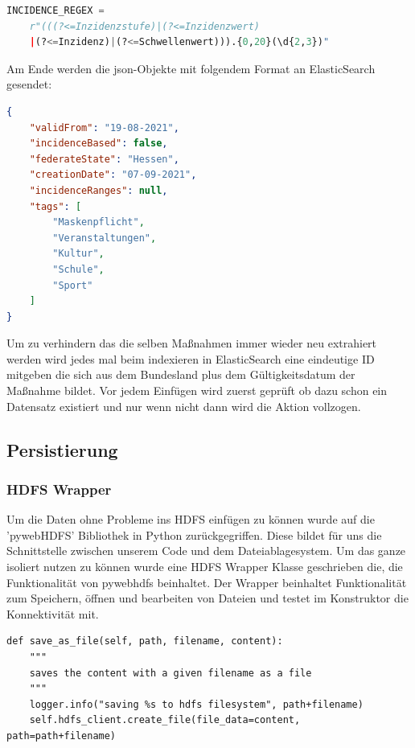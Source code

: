 \documentclass[12pt,oneside,a4paper,parskip]{scrbook}
\begin{document}
\begin{lstlisting}[basicstyle=\small, caption=Regex für Inzidenzschranken, language=Python]
INCIDENCE_REGEX =
	r"(((?<=Inzidenzstufe)|(?<=Inzidenzwert)
	|(?<=Inzidenz)|(?<=Schwellenwert))).{0,20}(\d{2,3})"
\end{lstlisting}
\pagebreak
Am Ende werden die json-Objekte mit folgendem Format an ElasticSearch gesendet:

\begin{lstlisting}[caption=Metadaten-Objekt, language=json]
{
	"validFrom": "19-08-2021",
	"incidenceBased": false,
	"federateState": "Hessen",
	"creationDate": "07-09-2021",
	"incidenceRanges": null,
	"tags": [
		"Maskenpflicht",
		"Veranstaltungen",
		"Kultur",
		"Schule",
		"Sport"
	]
}
\end{lstlisting}

Um zu verhindern das die selben Maßnahmen immer wieder neu extrahiert werden wird jedes mal beim indexieren in ElasticSearch eine eindeutige ID mitgeben die sich aus dem Bundesland plus dem Gültigkeitsdatum der Maßnahme bildet. Vor jedem Einfügen wird zuerst geprüft ob dazu schon ein Datensatz existiert und nur wenn nicht dann wird die Aktion vollzogen.

\subsection{Persistierung}

\subsubsection{HDFS Wrapper}

Um die Daten ohne Probleme ins HDFS einfügen zu können wurde auf die 'pywebHDFS' Bibliothek in Python zurückgegriffen. Diese bildet für uns die Schnittstelle zwischen unserem Code und dem Dateiablagesystem. Um das ganze isoliert nutzen zu können wurde eine HDFS Wrapper Klasse geschrieben die, die Funktionalität von pywebhdfs beinhaltet. Der Wrapper beinhaltet Funktionalität zum Speichern, öffnen und bearbeiten von Dateien und testet im Konstruktor die Konnektivität mit.

\begin{lstlisting}[basicstyle=\small, caption=Datei-Speicherungs Funktion]
def save_as_file(self, path, filename, content):
    """
    saves the content with a given filename as a file
    """
    logger.info("saving %s to hdfs filesystem", path+filename)
    self.hdfs_client.create_file(file_data=content, path=path+filename)
\end{lstlisting}
\end{document}

